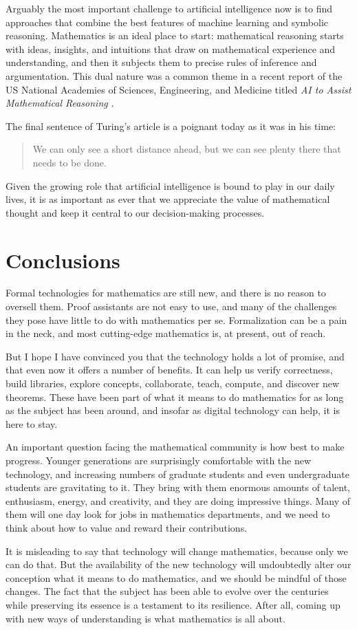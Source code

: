 \documentclass{amsart}
\theoremstyle{definition}
\theoremstyle{remark}
\numberwithin{equation}{section}
\begin{document}
Arguably the most important challenge to artificial intelligence now is to find approaches that combine the best features of machine learning and symbolic reasoning. Mathematics is an ideal place to start: mathematical reasoning starts with ideas, insights, and intuitions that draw on mathematical experience and understanding, and then it subjects them to precise rules of inference and argumentation. This dual nature was a common theme in a recent report of the US National Academies of Sciences, Engineering, and Medicine titled \emph{AI to Assist Mathematical Reasoning} \cite{national:academies:23}.

The final sentence of Turing's article is a poignant today as it was in his time:
\begin{quote}
We can only see a short distance ahead, but we can see plenty there that needs to be done.
\end{quote}
Given the growing role that artificial intelligence is bound to play in our daily lives, it is as important as ever that we appreciate the value of mathematical thought and keep it central to our decision-making processes.

\section*{Conclusions}

Formal technologies for mathematics are still new, and there is no reason to oversell them. Proof assistants are not easy to use, and many of the challenges they pose have little to do with mathematics per se. Formalization can be a pain in the neck, and most cutting-edge mathematics is, at present, out of reach.

But I hope I have convinced you that the technology holds a lot of promise, and that even now it offers a number of benefits. It can help us verify correctness, build libraries, explore concepts, collaborate, teach, compute, and discover new theorems. These have been part of what it means to do mathematics for as long as the subject has been around, and insofar as digital technology can help, it is here to stay.

An important question facing the mathematical community is how best to make progress. Younger generations are surprisingly comfortable with the new technology, and increasing numbers of graduate students and even undergraduate students are gravitating to it. They bring with them enormous amounts of talent, enthusiasm, energy, and creativity, and they are doing impressive things. Many of them will one day look for jobs in mathematics departments, and we need to think about how to value and reward their contributions.

It is misleading to say that technology will change mathematics, because only we can do that. But the availability of the new technology will undoubtedly alter our conception what it means to do mathematics, and we should be mindful of those changes. The fact that the subject has been able to evolve over the centuries while preserving its essence is a testament to its resilience. After all, coming up with new ways of understanding is what mathematics is all about.



\end{document}
